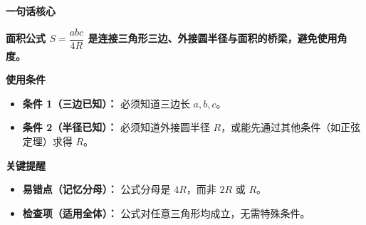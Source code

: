 \begin{summarybox}
	\textbf{\textcolor{CSummary}{一句话核心}}

	\textbf{面积公式 $S=\dfrac{abc}{4R}$ 是连接三角形三边、外接圆半径与面积的桥梁，避免使用角度。}

	\medskip
	\textbf{\textcolor{CSummary}{使用条件}}
	\begin{itemize}[leftmargin=*, itemsep=0.5em, topsep=0.4em]
		\item \textbf{条件 1（三边已知）：} 必须知道三边长 $a,b,c$。
		\item \textbf{条件 2（半径已知）：} 必须知道外接圆半径 $R$，或能先通过其他条件（如正弦定理）求得 $R$。
	\end{itemize}

	\medskip
	\textbf{\textcolor{CSummary}{关键提醒}}
	\begin{itemize}[leftmargin=*, itemsep=0.5em, topsep=0.4em]
		\item \textbf{易错点（记忆分母）：} 公式分母是 $4R$，而非 $2R$ 或 $R$。
		\item \textbf{检查项（适用全体）：} 公式对任意三角形均成立，无需特殊条件。
	\end{itemize}
\end{summarybox}

